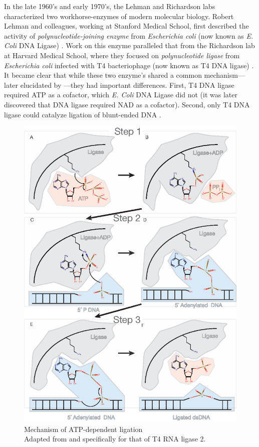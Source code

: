     In the late 1960's and early 1970's, the Lehman and Richardson labs characterized two workhorse-enzymes of modern molecular biology. Robert Lehman and colleagues, working at Stanford Medical School, first described the activity of \textit{polynucleotide-joining enzyme} from \textit{Escherichia coli} (now known as \textit{E. Coli} DNA Ligase) \citep{Olivera1967b}. Work on this enzyme paralleled that from the Richardson lab at Harvard Medical School, where they focused on \textit{polynucleotide ligase} from \textit{Escherichia coli} infected with T4 bacteriophage (now known as T4 DNA ligase) \citep{Weiss1967a}. It became clear that while these two enzyme's shared a common mechanism---later elucidated by \citep{Modrich1973a}---they had important differences. First, T4 DNA ligase required ATP as a cofactor, which \textit{E. Coli} DNA Ligase did not (it was later discovered that DNA ligase required NAD as a cofactor). Second, only T4 DNA ligase could catalyze ligation of blunt-ended DNA \citep{Tabor1987a}.

    \begin{figure}%
      \centering 
      \includegraphics{Figures/Intro/LigationMechanism.eps}
      \caption[Mechanism of Rnl2 ATP-dependent ligation]
      {
        Mechanism of ATP-dependent ligation\\[0.25cm]
        Adapted from \citep{Nandakumar2006} and specifically for that of T4 RNA ligase 2.
        }
      \label{Intro:fig:Ligation Mechanism}
      \end{figure}

